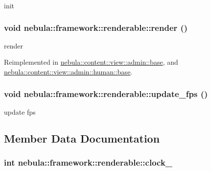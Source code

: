init \hypertarget{classnebula_1_1framework_1_1renderable_a97ba14a1d360e248ce8a82a3d2b7e15d}{
\subsubsection[{render}]{\setlength{\rightskip}{0pt plus 5cm}void nebula::framework::renderable::render ()}}
\label{classnebula_1_1framework_1_1renderable_a97ba14a1d360e248ce8a82a3d2b7e15d}


render 

Reimplemented in \hyperlink{classnebula_1_1content_1_1view_1_1admin_1_1base_a9bd1285f26e75372fd8c3cf1da848f29}{nebula::content::view::admin::base}, and \hyperlink{classnebula_1_1content_1_1view_1_1admin_1_1human_1_1base_a9ac7c00ce4bc7f8a8de608ef2092fcd0}{nebula::content::view::admin::human::base}.\hypertarget{classnebula_1_1framework_1_1renderable_aea9d32d02b305c788f8046396d0d0fe3}{
\subsubsection[{update\_\-fps}]{\setlength{\rightskip}{0pt plus 5cm}void nebula::framework::renderable::update\_\-fps ()}}
\label{classnebula_1_1framework_1_1renderable_aea9d32d02b305c788f8046396d0d0fe3}


update fps 

\subsection{Member Data Documentation}
\hypertarget{classnebula_1_1framework_1_1renderable_af923ef0d0bcae1f3a2af3c47bd3fc89b}{
\subsubsection[{clock\_\-}]{\setlength{\rightskip}{0pt plus 5cm}int {\bf nebula::framework::renderable::clock\_\-}}}
\label{classnebula_1_1framework_1_1renderable_af923ef0d0bcae1f3a2af3c47bd3fc89b}


